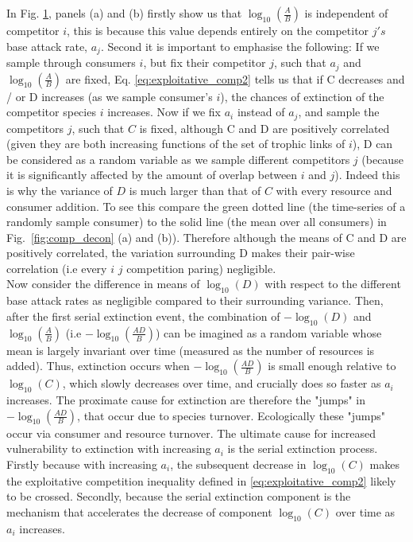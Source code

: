 \documentclass[a4paper]{report}
\DeclareMathOperator{\log}{log}
\begin{document}
{\begin{figure}[H]
{\label{fig:variation}}
\end{figure}


  In Fig. \ref{fig:variation}, panels (a) and (b) firstly show us that $\log_{10}(\frac{A}{B})$ is independent of competitor $i$, this is because this value depends entirely on the competitor $j's$ base attack rate, $a_j$. Second it is important to emphasise the following: If we sample through consumers $i$, but fix their competitor $j$, such that $a_j$ and $\log_{10}(\frac{A}{B})$ are fixed, Eq. \eqref{eq:exploitative_comp2} tells us that if C decreases and / or D increases (as we sample consumer's $i$), the chances of extinction of the competitor species $i$ increases. Now if we fix $a_i$ instead of $a_j$, and sample the competitors $j$, such that $C$ is fixed, although C and D are positively correlated (given they are both increasing functions of the set of trophic links of $i$), D can be considered as a random variable as we sample different competitors $j$ (because it is significantly affected by the amount of overlap between $i$ and $j$). Indeed this is why the variance of $D$ is much larger than that of $C$ with every resource and consumer addition. To see this compare the green dotted line (the time-series of a randomly sample consumer) to the solid line (the mean over all consumers) in Fig.~\ref{fig:comp_decon} (a) and (b)). Therefore although the means of C and D are positively correlated, the variation surrounding D makes their pair-wise correlation (i.e every $i$ $j$ competition paring) negligible. \\

Now consider the difference in means of $\log_{10}(D)$ with respect to the different base attack rates as negligible compared to their surrounding variance. Then, after the first serial extinction event, the combination of $-\log_{10}(D)$ and $\log_{10}(\frac{A}{B})$ (i.e $-\log_{10}(\frac{AD}{B})$) can be imagined as a random variable whose mean is largely invariant over time (measured as the number of resources is added). Thus, extinction occurs when $-\log_{10}(\frac{AD}{B})$ is small enough relative to $\log_{10}(C)$, which slowly decreases over time, and crucially does so faster as $a_i$ increases. The proximate cause for extinction are therefore the "jumps" in $-\log_{10}(\frac{AD}{B})$, that occur due to species turnover. Ecologically these "jumps" occur via consumer and resource turnover. The ultimate cause for increased vulnerability to extinction with increasing $a_i$ is the serial extinction process. Firstly because with increasing $a_i$, the subsequent decrease in $\log_{10}(C)$ makes the exploitative competition inequality defined in \eqref{eq:exploitative_comp2} likely to be crossed. Secondly, because the serial extinction component is the mechanism that accelerates the decrease of component $\log_{10}(C)$ over time as $a_i$ increases.


}
\end{document}

